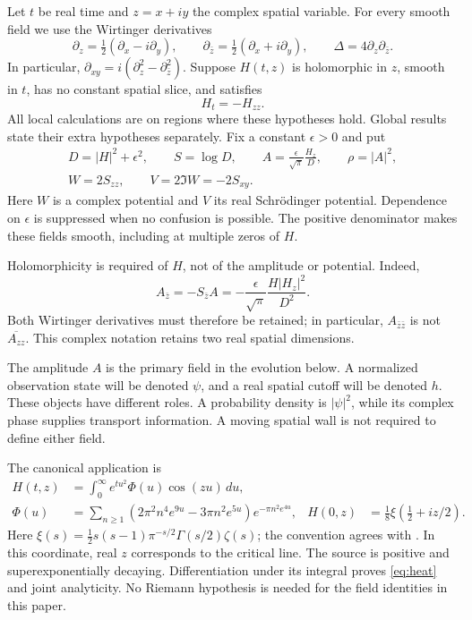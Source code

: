 \documentclass[11pt]{article}
\newcommand{\dd}{\,d}
\newcommand{\eps}{\epsilon}
\theoremstyle{definition}
\theoremstyle{remark}
\begin{document}
Let $t$ be real time and $z=x+iy$ the complex spatial variable. For
every smooth field we use the Wirtinger derivatives
\begin{equation}
 \partial_z=\tfrac12(\partial_x-i\partial_y),\qquad
 \partial_{\bar z}=\tfrac12(\partial_x+i\partial_y),\qquad
 \Delta=4\partial_z\partial_{\bar z}.
 \label{eq:wirtinger}
\end{equation}
In particular, $\partial_{xy}=i(\partial_z^2-\partial_{\bar z}^2)$.
Suppose $H(t,z)$ is holomorphic in $z$, smooth in $t$, has no constant spatial
slice, and satisfies
\begin{equation}
 H_t=-H_{zz}. \label{eq:heat}
\end{equation}
All local calculations are on regions where these hypotheses hold.
Global results state their extra hypotheses separately. Fix a constant
$\eps>0$ and put
\begin{equation}
 \begin{gathered}
 D=|H|^2+\eps^2,\qquad S=\log D,\qquad
 A=\frac{\eps}{\sqrt\pi}\frac{H_z}{D},\qquad\rho=|A|^2,\\
 W=2S_{zz},\qquad V=2\Im W=-2S_{xy}.
 \end{gathered}
 \label{eq:definition}
\end{equation}
Here $W$ is a complex potential and $V$ its real Schr\"odinger
potential. Dependence on $\eps$ is suppressed when no confusion is
possible. The positive denominator makes these fields smooth,
including at multiple zeros of $H$.

Holomorphicity is required of $H$, not of the amplitude or potential.
Indeed,
\begin{equation}
 A_{\bar z}=-S_{\bar z}A
 =-\frac{\eps}{\sqrt\pi}\frac{H|H_z|^2}{D^2}.
 \label{eq:nonholomorphic}
\end{equation}
Both Wirtinger derivatives must therefore be retained; in particular,
$A_{\bar z\bar z}$ is not $\overline{A_{zz}}$.
This complex notation retains two real spatial dimensions.

The amplitude $A$ is the primary field in the evolution below. A
normalized observation state will be denoted $\psi$, and a real spatial
cutoff will be denoted $h$. These objects have different roles. A
probability density is $|\psi|^2$, while its complex phase supplies
transport information. A moving spatial wall is not required to define
either field.

The canonical application is
\begin{align}
 H(t,z)&=\int_0^\infty e^{tu^2}\Phi(u)\cos(zu)\dd u,
 \label{eq:theta}\\
 \Phi(u)&=\sum_{n\ge1}
 (2\pi^2n^4e^{9u}-3\pi n^2e^{5u})e^{-\pi n^2e^{4u}},
 &H(0,z)&=\tfrac18\xi(\tfrac12+iz/2).
 \label{eq:source}
\end{align}
Here $\xi(s)=\tfrac12s(s-1)\pi^{-s/2}\Gamma(s/2)\zeta(s)$;
the convention agrees with \cite{polymath}. In this coordinate, real
$z$ corresponds to the critical line. The source is positive and
superexponentially decaying. Differentiation under its integral proves
\eqref{eq:heat} and joint analyticity. No Riemann hypothesis is needed
for the field identities in this paper.
\end{document}
